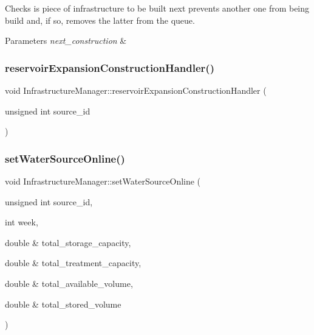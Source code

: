 Checks is piece of infrastructure to be built next prevents another one from being build and, if so, removes the latter from the queue. 
\begin{DoxyParams}{Parameters}
{\em next\+\_\+construction} & \\
\hline
\end{DoxyParams}
\mbox{\label{classInfrastructureManager_ad4dc157110b29560cd47501ba67bcba3}} 
\subsubsection{\texorpdfstring{reservoir\+Expansion\+Construction\+Handler()}{reservoirExpansionConstructionHandler()}}
{\footnotesize\ttfamily void Infrastructure\+Manager\+::reservoir\+Expansion\+Construction\+Handler (\begin{DoxyParamCaption}\item[{unsigned int}]{source\+\_\+id }\end{DoxyParamCaption})}

\mbox{\label{classInfrastructureManager_a9972a27ff6d08b7c1226d703ac700a94}} 
\subsubsection{\texorpdfstring{set\+Water\+Source\+Online()}{setWaterSourceOnline()}}
{\footnotesize\ttfamily void Infrastructure\+Manager\+::set\+Water\+Source\+Online (\begin{DoxyParamCaption}\item[{unsigned int}]{source\+\_\+id,  }\item[{int}]{week,  }\item[{double \&}]{total\+\_\+storage\+\_\+capacity,  }\item[{double \&}]{total\+\_\+treatment\+\_\+capacity,  }\item[{double \&}]{total\+\_\+available\+\_\+volume,  }\item[{double \&}]{total\+\_\+stored\+\_\+volume }\end{DoxyParamCaption})}

